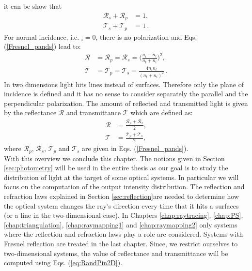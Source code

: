 it can be show that
\begin{equation}
\begin{split}
\mathcal{R}_s+\mathcal{R}_p &= 1,\\
\mathcal{T}_s+\mathcal{T}_p &=1\,.
\end{split}
\end{equation}
For normal incidence, i.e. \myangle$_i = 0$, there is no polarization and Eqs. (\ref{Fresnel_pands}) lead to:
\begin{equation}
\begin{split}
\mathcal{R} &= \mathcal{R}_p = \mathcal{R}_s = \Bigg(\frac{n_i-n_t}{n_t+n_i}\Bigg)^2, \\
\mathcal{T} &= \mathcal{T}_p = \mathcal{T}_s = \frac{4n_i n_t}{(n_t+n_i)^2}\,.
\end{split}
\end{equation}
\indent In two dimensions light hits lines instead of surfaces. Therefore only the plane of incidence is defined and it has no sense to consider separately the parallel and the perpendicular polarization. The amount of reflected and transmitted light is given by the reflectance $\mathcal{R}$ and transmittance $\mathcal{T}$ which are defined as:
\begin{equation}\begin{split}
\mathcal{R} &= \frac{\mathcal{R}_p+ \mathcal{R}_s}{2},\\
\mathcal{T} &= \frac{\mathcal{T}_p+ \mathcal{T}_s}{2}, 
\end{split}
\label{eq:RandTin2D}
\end{equation}
 where $\mathcal{R}_p$, $\mathcal{R}_s$, $\mathcal{T}_p$ and $\mathcal{T}_s$ are given in Eqs. (\ref{Fresnel_pands}). \\
\indent With this overview we conclude this chapter. The notions given in Section \ref{sec:photometry} will be used in the entire thesis as our goal is to study the distribution of light at the target of some optical systems. In particular we will focus on the computation of the output intensity distribution. The reflection and refraction laws explained in Section \ref{sec:reflection}are needed to determine how the optical system changes the ray's direction every time that it hits a surfaces (or a line in the two-dimensional case). In Chapters \ref{chap:raytracing}, \ref{chap:PS}, \ref{chap:triangulation}, \ref{chap:raymapping1} and \ref{chap:raymapping2} only systems where the reflection and refraction laws play a role are considered. Systems with Fresnel reflection are treated in the last chapter. Since, we restrict ourselves to two-dimensional systems, the value of reflectance and transmittance will be computed using Eqs. (\ref{eq:RandPin2D}).


